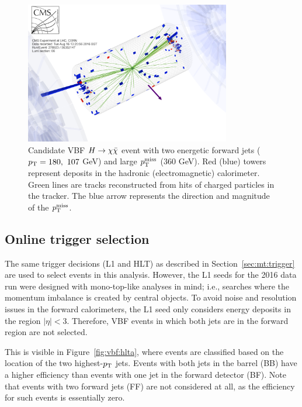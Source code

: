 \begin{figure}[]
    \begin{center}
        \includegraphics[width=0.8\textwidth]{figures/vbf/misc/event_display.png}
        \caption{Candidate VBF $H\rightarrow\chi\bar\chi$ event with two energetic forward jets ($p_\mathrm{T}=180,~107$ GeV) and large $p_\mathrm{T}^\mathrm{miss}$ ($360$ GeV).
                 Red (blue) towers represent deposits in the hadronic (electromagnetic) calorimeter.
                 Green lines are tracks reconstructed from hits of charged particles in the tracker. 
                 The blue arrow represents the direction and magnitude of the $p_\mathrm{T}^\mathrm{miss}$.}
        \label{fig:vbf:ed}
    \end{center}
\end{figure}

\subsection{Online trigger selection}
\label{sec:vbf:trig}

The same trigger decisions (L1 and HLT) as described in Section~\ref{sec:mt:trigger} are used to select events in this analysis.
However, the L1 seeds for the 2016 data run were designed with mono-top-like analyses in mind; i.e., searches where the momentum imbalance is created by central objects.
To avoid noise and resolution issues in the forward calorimeters, the L1 seed only considers energy deposits in the region ${|\eta|<3}$. 
Therefore, VBF events in which both jets are in the forward region are not selected.  

This is visible in Figure~\ref{fig:vbf:hlta}, where events are classified based on the location of the two highest-$p_\mathrm{T}$ jets.
Events with both jets in the barrel (BB) have a higher efficiency than events with one jet in the forward detector (BF).
Note that events with two forward jets (FF) are not considered at all, as the efficiency for such events is essentially zero. 

